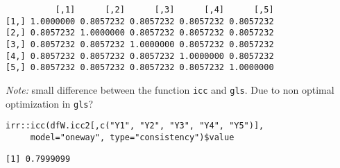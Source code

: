 \documentclass[12pt]{article}
\begin{document}
\begin{verbatim}
          [,1]      [,2]      [,3]      [,4]      [,5]
[1,] 1.0000000 0.8057232 0.8057232 0.8057232 0.8057232
[2,] 0.8057232 1.0000000 0.8057232 0.8057232 0.8057232
[3,] 0.8057232 0.8057232 1.0000000 0.8057232 0.8057232
[4,] 0.8057232 0.8057232 0.8057232 1.0000000 0.8057232
[5,] 0.8057232 0.8057232 0.8057232 0.8057232 1.0000000
\end{verbatim}

\clearpage

\emph{Note:} small difference between the function \texttt{icc} and
\texttt{gls}. Due to non optimal optimization in \texttt{gls}?

\lstset{language=r,label= ,caption= ,captionpos=b,numbers=none}
\begin{lstlisting}
irr::icc(dfW.icc2[,c("Y1", "Y2", "Y3", "Y4", "Y5")],
	 model="oneway", type="consistency")$value
\end{lstlisting}

\begin{verbatim}
[1] 0.7999099
\end{verbatim}
\end{document}
